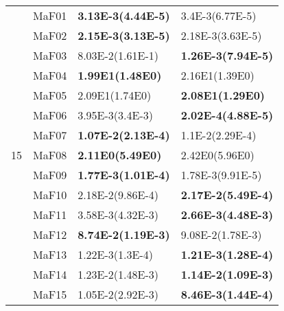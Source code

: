 \documentclass[]{article}
\begin{document}
\begin{table}
\begin{footnotesize}
\begin{tabular}{|l|l|l|l|}
\multirow{15}{*}{15} & MaF01 & \cellcolor{gray95} {\bf 3.13E-3(4.44E-5)} & 3.4E-3(6.77E-5)\\
 & MaF02 & \cellcolor{gray95} {\bf 2.15E-3(3.13E-5)} & 2.18E-3(3.63E-5)\\
 & MaF03 & 8.03E-2(1.61E-1) & \cellcolor{gray95} {\bf 1.26E-3(7.94E-5)}\\
 & MaF04 & \cellcolor{gray95} {\bf 1.99E1(1.48E0)} & 2.16E1(1.39E0)\\
 & MaF05 & \cellcolor{gray95} 2.09E1(1.74E0) & \cellcolor{gray95} {\bf 2.08E1(1.29E0)}\\
 & MaF06 & 3.95E-3(3.4E-3) & \cellcolor{gray95} {\bf 2.02E-4(4.88E-5)}\\
 & MaF07 & \cellcolor{gray95} {\bf 1.07E-2(2.13E-4)} & 1.1E-2(2.29E-4)\\
 & MaF08 & \cellcolor{gray95} {\bf 2.11E0(5.49E0)} & \cellcolor{gray95} 2.42E0(5.96E0)\\
 & MaF09 & \cellcolor{gray95} {\bf 1.77E-3(1.01E-4)} & \cellcolor{gray95} 1.78E-3(9.91E-5)\\
 & MaF10 & \cellcolor{gray95} 2.18E-2(9.86E-4) & \cellcolor{gray95} {\bf 2.17E-2(5.49E-4)}\\
 & MaF11 & \cellcolor{gray95} 3.58E-3(4.32E-3) & \cellcolor{gray95} {\bf 2.66E-3(4.48E-3)}\\
 & MaF12 & \cellcolor{gray95} {\bf 8.74E-2(1.19E-3)} & 9.08E-2(1.78E-3)\\
 & MaF13 & \cellcolor{gray95} 1.22E-3(1.3E-4) & \cellcolor{gray95} {\bf 1.21E-3(1.28E-4)}\\
 & MaF14 & 1.23E-2(1.48E-3) & \cellcolor{gray95} {\bf 1.14E-2(1.09E-3)}\\
 & MaF15 & \cellcolor{gray95} 1.05E-2(2.92E-3) & \cellcolor{gray95} {\bf 8.46E-3(1.44E-4)}\\
\hline
\end{tabular}
\end{footnotesize}
\end{table}
\end{document}
